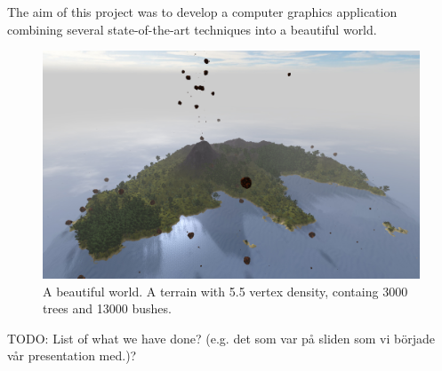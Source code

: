 The aim of this project was to develop a computer graphics application combining several state-of-the-art techniques into a beautiful world. 
\begin{figure}[H]
  \centering
  \includegraphics[width=1.0\linewidth]{images/frontImage.jpg}
  \caption{A beautiful world. A terrain with 5.5 vertex density, containg 3000 trees and 13000 bushes.}
  \label{fig:beautifulIsland}
\end{figure}%

TODO: List of what we have done? (e.g. det som var på sliden som vi började vår presentation med.)?